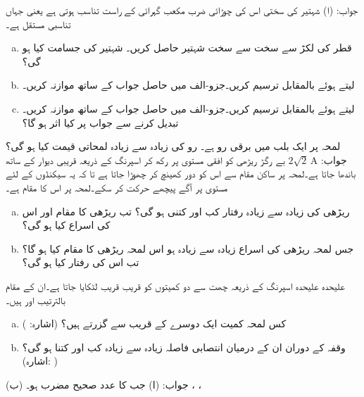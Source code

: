 جواب:\quad
(ا) 
\quad
شہتیر کی سختی  اس کی چوڑائی  ضرب مکعب گہرائی  کے راست تناسب ہوتی ہے یعنی  جہاں  تناسبی مستقل ہے۔ 
\begin{enumerate}[a.]
\item
{} قطر کی لکڑ سے سخت سے سخت شہتیر حاصل کریں۔ شہتیر کی جسامت کیا ہو گی؟
\item
{} لیتے ہوئے  بالمقابل  ترسیم کریں۔جزو-الف میں حاصل جواب کے ساتھ موازنہ کریں۔
\item
{} لیتے ہوئے  بالمقابل  ترسیم کریں۔جزو-الف میں حاصل جواب کے ساتھ موازنہ کریں۔  تبدیل کرنے سے جواب پر کیا اثر ہو گا؟
\end{enumerate}
لمحہ  پر ایک بلب میں برقی رو  ہے۔ رو کی زیادہ سے زیادہ لمحاتی قیمت کیا ہو گی؟\\
جواب:\quad
$2\sqrt{2}\,\si{\ampere}$
بے رگڑ ریڑھی کو افقی مستوی پر رکھ کر اسپرنگ کے ذریعہ قریبی دیوار کے ساتھ باندھا جاتا ہے۔لمحہ  پر ساکن مقام سے اس کو  دور کھینچ کر چھوڑا جاتا ہے تا کہ یہ  سیکنڈوں کے لئے مستوی پر آگے پیچھے حرکت کر سکے۔لمحہ  پر اس کا مقام  ہے۔
\begin{enumerate}[a.]
\item
ریڑھی کی زیادہ سے زیادہ رفتار کب اور  کتنی ہو گی؟ تب ریڑھی کا مقام اور اس کی اسراع  کیا ہو گی؟
\item
جس لمحہ ریڑھی کی اسراع زیادہ سے زیادہ ہو اس لمحہ ریڑھی کا مقام کیا ہو گا؟ تب اس کی رفتار کیا ہو گی؟ 
\end{enumerate}
علیحدہ علیحدہ اسپرنگ کے ذریعہ چھت سے دو کمیتوں کو قریب قریب لٹکایا جاتا ہے۔ان کے مقام بالترتیب  اور  ہیں۔
\begin{enumerate}[a.]
\item
کس لمحہ کمیت ایک دوسرے کے قریب سے گزرتے ہیں؟ (اشارہ: )
\item
وقفہ  کے دوران ان کے درمیان انتصابی فاصلہ زیادہ سے زیادہ کب اور کتنا ہو گی؟ \\(اشارہ: ) 
\end{enumerate} 
جواب:\quad
(ا) جب  کا عدد صحیح مضرب  ہو۔  (ب) ، ، 
